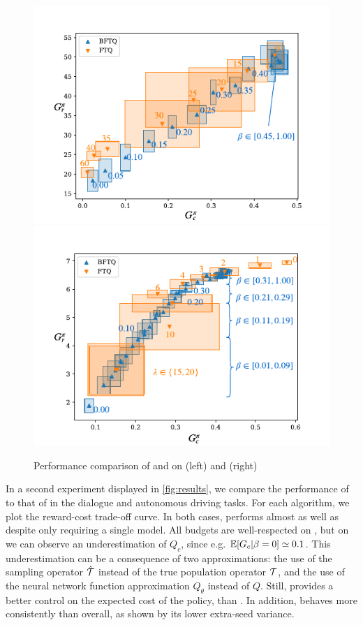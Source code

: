 \begin{figure}[tp]
	\begin{center}
		\includegraphics[width=0.49\linewidth]{img/slot-filling}
		\includegraphics[width=0.49\linewidth]{img/highway}
		\caption{Performance comparison of \FTQl and \BFTQ on  (left) and (right) }
		\label{fig:results}
	\end{center}
\end{figure}

In a second experiment displayed in \autoref{fig:results}, we compare the performance of \FTQl to that of \BFTQ in the dialogue and autonomous driving tasks. For each algorithm, we plot the reward-cost trade-off curve. In both cases, \BFTQ performs almost as well as \FTQl despite only requiring a single model. All budgets are well-respected on , but on  we can observe an underestimation of $Q_c$, since e.g. $\operatorname*{\mathbb{E}}[G_c|\beta=0] \simeq 0.1 $. This underestimation can be a consequence of two approximations: the use of the sampling operator $\hat{\mathcal{T}}$ instead of the true population operator $\mathcal{T}$, and the use of the neural network function approximation $Q_\theta$ instead of $Q$. 
Still, \BFTQ provides a better control on the expected cost of the policy, than \FTQl. In addition, \BFTQ behaves more consistently than \FTQl overall, as shown by its lower extra-seed variance.


